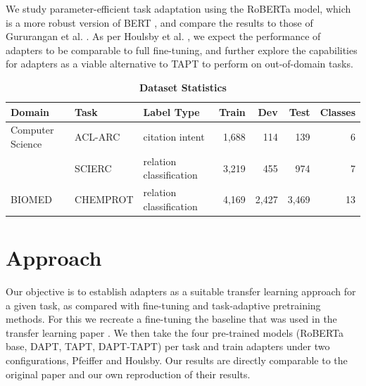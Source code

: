 \documentclass[10pt,twocolumn,letterpaper]{article}
\begin{document}
We study parameter-efficient task adaptation using the RoBERTa model, which is a more robust version of BERT \cite{liu2019roberta}, and compare the results to those of Gururangan et al. \cite{gururangan2020dont}. As per Houlsby et al. \cite{houlsby2019parameter}, we expect the performance of adapters to be comparable to full fine-tuning, and further explore the capabilities for adapters as a viable alternative to TAPT to perform on out-of-domain tasks.

\begin{table}[h]
    \centering
    \begin{tabular}{ l l l r r r r }
      \hline
      \textbf{Domain} & \textbf{Task} & \textbf{Label Type} & \textbf{Train} & \textbf{Dev}   & \textbf{Test}  & \textbf{Classes} \\
      \hline
      Computer Science & ACL-ARC & citation intent & 1,688 & 114   & 139   & 6 \\
                       & SCIERC  & relation classification & 3,219 & 455   & 974   & 7 \\
      \hline
      BIOMED           & CHEMPROT & relation classification & 4,169 & 2,427 & 3,469 & 13 \\
      \hline
    \end{tabular}%
    \caption{\textbf{Dataset Statistics}}
    \label{tab:dataset-stats}%
  \end{table}%

\section{Approach}
Our objective is to establish adapters as a suitable transfer learning approach for a given task, as compared with fine-tuning and task-adaptive pretraining methods. For this we recreate a fine-tuning the baseline that was used in the transfer learning paper \cite{gururangan2020dont}. We then take the four pre-trained models (RoBERTa base, DAPT, TAPT, DAPT-TAPT) per task and train adapters under two configurations, Pfeiffer and Houlsby. Our results are directly comparable to the original paper \cite{gururangan2020dont} and our own reproduction of their results.
\end{document}

